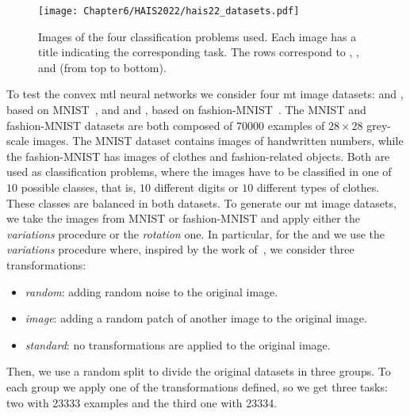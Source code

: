 \begin{figure}[t!]
    \texttt{[image: Chapter6/HAIS2022/hais22\_datasets.pdf]}
    \caption{Images of the four classification problems used. Each image has a title indicating the corresponding task. The rows correspond to , ,  and  (from top to bottom).}
    \label{fig:problems_hais2022}
\end{figure}

To test the convex \acrshort{mtl} neural networks we consider four \acrshort{mt} image datasets:
 and , based on MNIST~\citep{LeCunBBH98}, and  and , based on fashion-MNIST~\citep{xiao2017}.
%
The MNIST and fashion-MNIST datasets are both composed of \num{70000} examples of $28\times 28$ grey-scale images. The MNIST dataset contains images of handwritten numbers, while the fashion-MNIST has images of clothes and fashion-related objects.
Both are used as classification problems, where the images have to be classified in one of $10$ possible classes, that is, $10$ different digits or $10$ different types of clothes. These classes are balanced in both datasets.
%
To generate our \acrshort{mt} image datasets, we take the images from MNIST or fashion-MNIST and apply either the \emph{variations} procedure or the \emph{rotation} one.
%
In particular, for the  and  we use the \emph{variations} procedure where, inspired by the work of~\cite{BergstraB12}, we consider three transformations:
\begin{itemize}
    \item \textit{random}: adding random noise to the original image.
    \item \textit{image}: adding a random patch of another image to the original image.
    \item \textit{standard}: no transformations are applied to the original image.
\end{itemize}
Then, we use a random split to divide the original datasets in three groups. To each group we apply one of the transformations defined, so we get three tasks: two with \num{23333} examples and the third one with \num{23334}.

